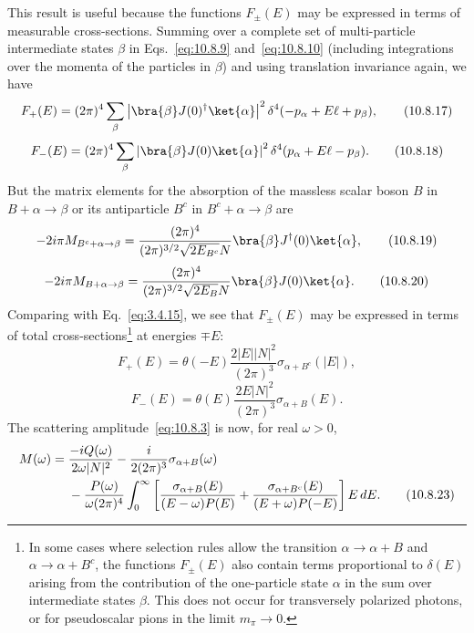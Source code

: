 This result is useful because the functions $F_\pm(E)$ may be expressed
in terms of measurable cross-sections. Summing over a complete set of
multi-particle intermediate states $\beta$ in Eqs.~\eqref{eq:10.8.9}
and~\eqref{eq:10.8.10} (including integrations over the momenta of the
particles in $\beta$) and using translation invariance again, we have
\begin{equation}
  F_+(E)=(2\pi)^4\sum_\beta
  \left|\bra{\beta}J(0)^\dagger\ket{\alpha}\right|^2
  \delta^4(-p_\alpha+E\ell+p_\beta),
  \tag{10.8.17}\label{eq:10.8.17}
\end{equation}
\begin{equation}
  F_-(E)=(2\pi)^4\sum_\beta
  \left|\bra{\beta}J(0)\ket{\alpha}\right|^2
  \delta^4(p_\alpha+E\ell-p_\beta).
  \tag{10.8.18}\label{eq:10.8.18}
\end{equation}
But the matrix elements for the absorption of the massless scalar boson
$B$ in $B+\alpha\to\beta$ or its antiparticle $B^c$ in
$B^c+\alpha\to\beta$ are
\begin{equation}
  -2i\pi M_{B^c+\alpha\to\beta}
  =\frac{(2\pi)^4}{(2\pi)^{3/2}\sqrt{2E_{B^c}}N}
  \bra{\beta}J^\dagger(0)\ket{\alpha},
  \tag{10.8.19}\label{eq:10.8.19}
\end{equation}
\begin{equation}
  -2i\pi M_{B+\alpha\to\beta}
  =\frac{(2\pi)^4}{(2\pi)^{3/2}\sqrt{2E_B}N}
  \bra{\beta}J(0)\ket{\alpha}.
  \tag{10.8.20}\label{eq:10.8.20}
\end{equation}
Comparing with Eq.~\eqref{eq:3.4.15}, we see that $F_\pm(E)$ may be
expressed in terms of total cross-sections\footnote{In some cases where
selection rules allow the transition $\alpha\to\alpha+B$ and
$\alpha\to\alpha+B^c$, the functions $F_\pm(E)$ also contain terms
proportional to $\delta(E)$ arising from the contribution of the one-particle
state $\alpha$ in the sum over intermediate states $\beta$. This does not
occur for transversely polarized photons, or for pseudoscalar pions in the
limit $m_\pi\to0$.} at energies $\mp E$:
\begin{equation}
  F_+(E)=\theta(-E)\frac{2|E||N|^2}{(2\pi)^3}
  \sigma_{\alpha+B^c}(|E|),
  \tag{10.8.21}\label{eq:10.8.21}
\end{equation}
\begin{equation}
  F_-(E)=\theta(E)\frac{2E|N|^2}{(2\pi)^3}
  \sigma_{\alpha+B}(E).
  \tag{10.8.22}\label{eq:10.8.22}
\end{equation}
The scattering amplitude~\eqref{eq:10.8.3} is now, for real $\omega>0$,
\begin{align}
  M(\omega)={}&\frac{-iQ(\omega)}{2\omega|N|^2}
  -\frac{i}{2(2\pi)^3}\sigma_{\alpha+B}(\omega)\notag\\
  &{}-\frac{P(\omega)}{\omega(2\pi)^4}\int_0^\infty
  \left[\frac{\sigma_{\alpha+B}(E)}{(E-\omega)P(E)}
  +\frac{\sigma_{\alpha+B^c}(E)}{(E+\omega)P(-E)}\right]E\,dE.
  \tag{10.8.23}\label{eq:10.8.23}
\end{align}
